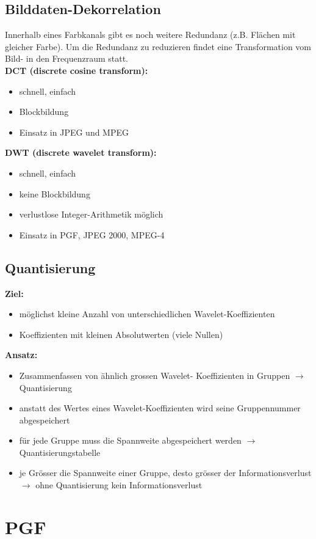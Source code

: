 \documentclass[10pt]{article}
\begin{document}
\subsection{Bilddaten-Dekorrelation}
Innerhalb eines Farbkanals gibt es noch weitere Redundanz (z.B. Flächen mit gleicher Farbe). Um die Redundanz zu reduzieren findet eine Transformation vom Bild- in den Frequenzraum statt. \\
\textbf{DCT (discrete cosine transform):}
\begin{itemize}
	\item schnell, einfach
	\item Blockbildung
	\item Einsatz in JPEG und MPEG
\end{itemize}
\textbf{DWT (discrete wavelet transform):}
\begin{itemize}
	\item schnell, einfach
	\item keine Blockbildung
	\item verlustlose Integer-Arithmetik möglich
	\item Einsatz in PGF, JPEG 2000, MPEG-4
\end{itemize}

\subsection{Quantisierung}
\textbf{Ziel:}
\begin{itemize}
	\item möglichst kleine Anzahl von unterschiedlichen Wavelet-Koeffizienten
	\item Koeffizienten mit kleinen Absolutwerten (viele Nullen)
\end{itemize}
\textbf{Ansatz:}
\begin{itemize}
	\item Zusammenfassen von ähnlich grossen Wavelet- Koeffizienten in Gruppen $\rightarrow$ Quantisierung
	\item anstatt des Wertes eines Wavelet-Koeffizienten wird seine Gruppennummer abgespeichert
	\item für jede Gruppe muss die Spannweite abgespeichert werden $\rightarrow$ Quantisierungstabelle
	\item je Grösser die Spannweite einer Gruppe, desto grösser der Informationsverlust $\rightarrow$ ohne Quantisierung kein Informationsverlust
\end{itemize}

\pagebreak
\section{PGF}
\end{document}
